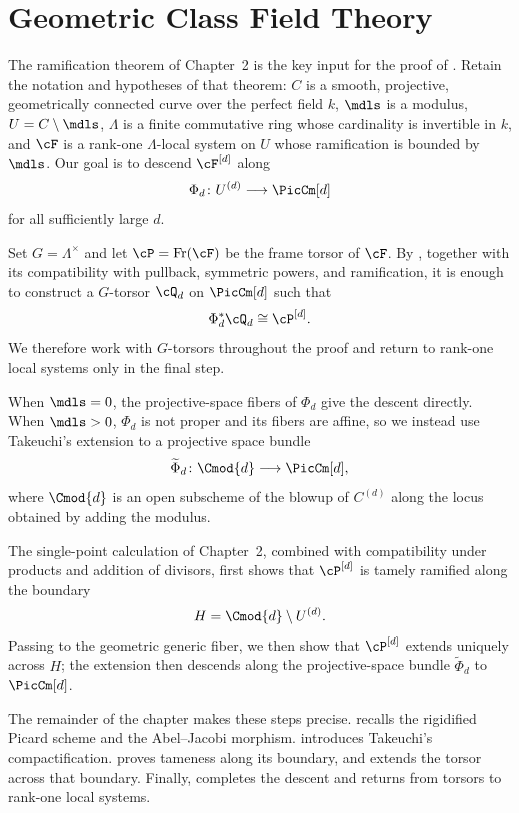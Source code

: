 \chapter{Geometric Class Field Theory}\label{section:gcft}

The ramification theorem of Chapter~2 is the key input for the proof of
. Retain the notation and hypotheses of that theorem:
$C$ is a smooth, projective, geometrically connected curve over the perfect
field $k$, $\mdls$ is a modulus, $U=C\setminus\mdls$, $\Lambda$ is a finite
commutative ring whose cardinality is invertible in $k$, and $\cF$ is a
rank-one $\Lambda$-local system on $U$ whose ramification is bounded by
$\mdls$. Our goal is to descend $\cF^{[d]}$ along
\[
    \Phi_d\colon U^{(d)}\longrightarrow\PicCm[d]
\]
for all sufficiently large $d$.

Set $G=\Lambda^\times$ and let
$\cP=\operatorname{Fr}(\cF)$ be the frame torsor of $\cF$. By
, together with its compatibility with
pullback, symmetric powers, and ramification, it is enough to construct a
$G$-torsor $\cQ_d$ on $\PicCm[d]$ such that
\[
    \Phi_d^*\cQ_d\cong\cP^{[d]}.
\]
We therefore work with $G$-torsors throughout the proof and return to
rank-one local systems only in the final step.

When $\mdls=0$, the projective-space fibers of $\Phi_d$ give the descent
directly. When $\mdls>0$, $\Phi_d$ is not proper and its fibers are affine,
so we instead use Takeuchi's extension to a projective space bundle
\[
    \widetilde\Phi_d\colon
    \Cmod{d}
    \longrightarrow \PicCm[d],
\]
where $\Cmod{d}$ is an open subscheme of the blowup of
$C^{(d)}$ along the locus obtained by adding the modulus.

The single-point calculation of Chapter~2, combined with compatibility
under products and addition of divisors, first shows that
$\cP^{[d]}$ is
tamely ramified along the boundary
\[
    H=\Cmod{d}\setminus U^{(d)}.
\]
Passing to the geometric generic fiber, we then show that $\cP^{[d]}$ extends
uniquely across $H$; the extension then descends along the projective-space
bundle $\widetilde\Phi_d$ to $\PicCm[d]$.

The remainder of the chapter makes these steps precise.
 recalls the rigidified
Picard scheme and the Abel--Jacobi morphism.
 introduces Takeuchi's
compactification.
 proves tameness along its
boundary, and  extends the torsor
across that boundary. Finally,  completes the
descent and returns from torsors to rank-one local systems.

